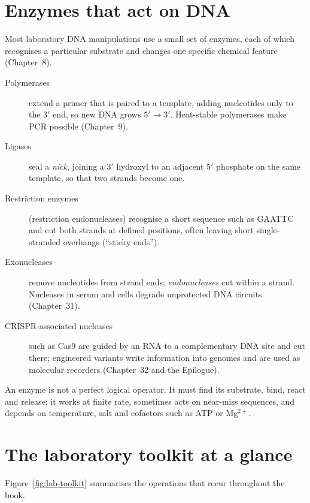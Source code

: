 \section{Enzymes that act on DNA}
Most laboratory DNA manipulations use a small set of enzymes, each of which
recognises a particular substrate and changes one specific chemical feature
(Chapter~8).
\begin{description}
\item[Polymerases] extend a primer that is paired to a template, adding
nucleotides only to the $3'$ end, so new DNA grows $5'\to3'$. Heat-stable
polymerases make PCR possible (Chapter~9).
\item[Ligases] seal a \emph{nick}, joining a $3'$ hydroxyl to an adjacent $5'$
phosphate on the same template, so that two strands become one.
\item[Restriction enzymes] (restriction endonucleases) recognise a short
sequence such as GAATTC and cut both strands at defined positions, often leaving
short single-stranded overhangs (``sticky ends'').
\item[Exonucleases] remove nucleotides from strand ends; \emph{endonucleases}
cut within a strand. Nucleases in serum and cells degrade unprotected DNA
circuits (Chapter~31).
\item[CRISPR-associated nucleases] such as Cas9 are guided by an RNA to a
complementary DNA site and cut there; engineered variants write information into
genomes and are used as molecular recorders (Chapter~32 and the Epilogue).
\end{description}
An enzyme is not a perfect logical operator. It must find its substrate,
bind, react and release; it works at finite rate, sometimes acts on near-miss
sequences, and depends on temperature, salt and cofactors such as ATP or
Mg$^{2+}$.

\section{The laboratory toolkit at a glance}
Figure~\ref{fig:lab-toolkit} summarises the operations that recur throughout
the book.


